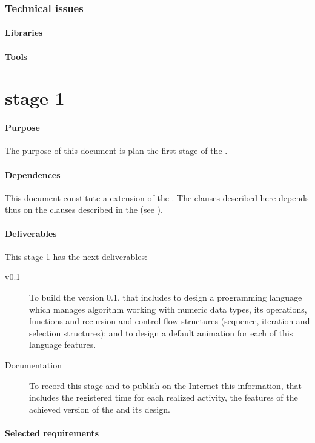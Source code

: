 \documentclass[twocolumn]{article}
\begin{document}
\section{Technical issues}
\subsection{Libraries}
\subsection{Tools}

\part{\favpl stage 1}
\label{part:st1-plan}

\subsection{Purpose}
The purpose of this document is plan the first stage of the
\favp.

\subsection{Dependences}
This document constitute a extension of the \favpl. The clauses
described here depends thus on the clauses described in the \favpl
(see ).

\subsection{Deliverables}
This stage 1 has the next deliverables:

\begin{description}
\item[\fav v0.1] To build the \fav version 0.1, that includes to design a
  \fav programming language which manages algorithm working with
  numeric data types, its operations, functions and recursion and
  control flow structures (sequence, iteration and selection
  structures); and to design a default animation for each of this
  language features.
\item[Documentation] To record this stage and to publish on the
  Internet this information, that includes the registered time for
  each realized activity, the features of the achieved version of the
  \fav and its design.
\end{description}

\subsection{Selected requirements}
\end{document}
